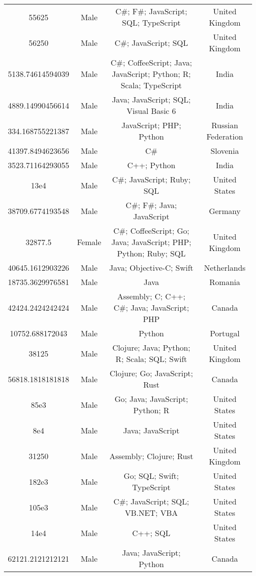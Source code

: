 \begin{center}
\begin{tabular}{ |c|c|c|c| }
55625  &  Male  &  C\#; F\#; JavaScript; SQL; TypeScript  &  United Kingdom  \\ 
56250  &  Male  &  C\#; JavaScript; SQL  &  United Kingdom  \\ 
5138.74614594039  &  Male  &  C\#; CoffeeScript; Java; JavaScript; Python; R; Scala; TypeScript  &  India  \\ 
4889.14990456614  &  Male  &  Java; JavaScript; SQL; Visual Basic 6  &  India  \\ 
334.168755221387  &  Male  &  JavaScript; PHP; Python  &  Russian Federation  \\ 
41397.8494623656  &  Male  &  C\#  &  Slovenia  \\ 
3523.71164293055  &  Male  &  C++; Python  &  India  \\ 
13e4  &  Male  &  C\#; JavaScript; Ruby; SQL  &  United States  \\ 
38709.6774193548  &  Male  &  C\#; F\#; Java; JavaScript  &  Germany  \\ 
32877.5  &  Female  &  C\#; CoffeeScript; Go; Java; JavaScript; PHP; Python; Ruby; SQL  &  United Kingdom  \\ 
40645.1612903226  &  Male  &  Java; Objective-C; Swift  &  Netherlands  \\ 
18735.3629976581  &  Male  &  Java  &  Romania  \\ 
42424.2424242424  &  Male  &  Assembly; C; C++; C\#; Java; JavaScript; PHP  &  Canada  \\ 
10752.688172043  &  Male  &  Python  &  Portugal  \\ 
38125  &  Male  &  Clojure; Java; Python; R; Scala; SQL; Swift  &  United Kingdom  \\ 
56818.1818181818  &  Male  &  Clojure; Go; JavaScript; Rust  &  Canada  \\ 
85e3  &  Male  &  Go; Java; JavaScript; Python; R  &  United States  \\ 
8e4  &  Male  &  Java; JavaScript  &  United States  \\ 
31250  &  Male  &  Assembly; Clojure; Rust  &  United Kingdom  \\ 
182e3  &  Male  &  Go; SQL; Swift; TypeScript  &  United States  \\ 
105e3  &  Male  &  C\#; JavaScript; SQL; VB.NET; VBA  &  United States  \\ 
14e4  &  Male  &  C++; SQL  &  United States  \\ 
62121.2121212121  &  Male  &  Java; JavaScript; Python  &  Canada  \\ 

\end{tabular}
\end{center}
